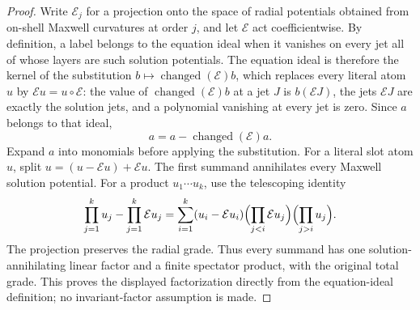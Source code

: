 \begin{proof}
Write $\mathcal E_j$ for a projection onto the space of radial potentials
obtained from on-shell Maxwell curvatures at order $j$, and let $\mathcal E$
act coefficientwise. By definition, a label belongs to the equation ideal
when it vanishes on every jet all of whose layers are such solution
potentials. The equation
ideal is therefore the kernel of the substitution
$b\mapsto \operatorname{changed}(\mathcal E)b$, which replaces every
literal atom $u$ by $\mathcal E u=u\circ\mathcal E$: the value of
$\operatorname{changed}(\mathcal E)b$ at a jet $J$ is $b(\mathcal EJ)$,
the jets $\mathcal EJ$ are exactly the solution jets, and a polynomial
vanishing at every jet is zero. Since $a$ belongs
to that ideal,
\[
                 a=a-\operatorname{changed}(\mathcal E)a.
\]
Expand $a$ into monomials before applying the substitution. For a literal
slot atom $u$, split $u=(u-\mathcal E u)+\mathcal E u$. The first
summand annihilates every Maxwell solution potential. For a product
$u_1\cdots u_k$, use
the telescoping identity
\[
 \prod_{j=1}^k u_j-\prod_{j=1}^k\mathcal E u_j
 =\sum_{i=1}^k (u_i-\mathcal E u_i)
       \Bigl(\prod_{j<i}\mathcal E u_j\Bigr)
       \Bigl(\prod_{j>i}u_j\Bigr).
\]
The projection preserves the radial grade. Thus every summand has one
solution-annihilating linear factor and a finite spectator product, with the
original total grade. This proves the displayed factorization directly
from the equation-ideal definition; no invariant-factor assumption is
made.


\end{proof}

